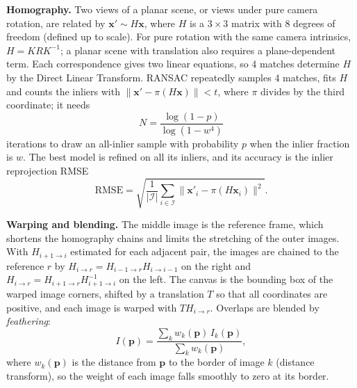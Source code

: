 \documentclass[a4paper,12pt]{article}
\begin{document}
\textbf{Homography.} Two views of a planar scene, or views under pure camera rotation, are related by $\mathbf{x}'\sim H\mathbf{x}$, where $H$ is a $3\times3$ matrix with 8 degrees of freedom (defined up to scale). For pure rotation with the same camera intrinsics, $H=KRK^{-1}$; a planar scene with translation also requires a plane-dependent term. Each correspondence gives two linear equations, so 4 matches determine $H$ by the Direct Linear Transform. RANSAC repeatedly samples 4 matches, fits $H$ and counts the inliers with $\|\mathbf{x}'-\pi(H\mathbf{x})\|<t$, where $\pi$ divides by the third coordinate; it needs
\begin{equation}
N=\frac{\log(1-p)}{\log(1-w^{4})}
\end{equation}
iterations to draw an all-inlier sample with probability $p$ when the inlier fraction is $w$. The best model is refined on all its inliers, and its accuracy is the inlier reprojection RMSE
\begin{equation}
\mathrm{RMSE}=\sqrt{\frac{1}{|\mathcal I|}\sum_{i\in\mathcal I}\|\mathbf{x}'_i-\pi(H\mathbf{x}_i)\|^2}.
\end{equation}

\textbf{Warping and blending.} The middle image is the reference frame, which shortens the homography chains and limits the stretching of the outer images. With $H_{i+1\to i}$ estimated for each adjacent pair, the images are chained to the reference $r$ by $H_{i\to r}=H_{i-1\to r}H_{i\to i-1}$ on the right and $H_{i\to r}=H_{i+1\to r}H_{i+1\to i}^{-1}$ on the left. The canvas is the bounding box of the warped image corners, shifted by a translation $T$ so that all coordinates are positive, and each image is warped with $TH_{i\to r}$. Overlaps are blended by \emph{feathering}:
\begin{equation}
I(\mathbf p)=\frac{\sum_k w_k(\mathbf p)\,I_k(\mathbf p)}{\sum_k w_k(\mathbf p)},
\end{equation}
where $w_k(\mathbf p)$ is the distance from $\mathbf p$ to the border of image $k$ (distance transform), so the weight of each image falls smoothly to zero at its border.
\end{document}
